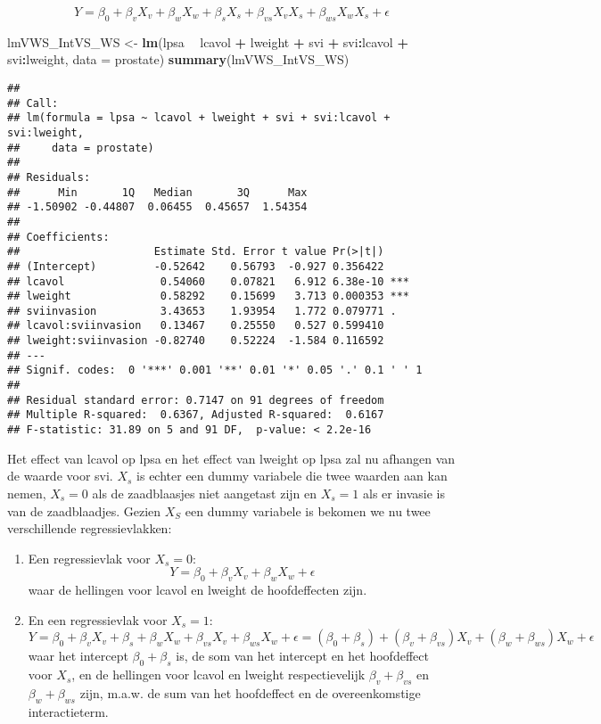 \documentclass[12pt,dutch,coursenotes]{book}
\newenvironment{Shaded}{\begin{snugshade}}{\end{snugshade}}
\newcommand{\KeywordTok}[1]{\textcolor[rgb]{0.13,0.29,0.53}{\textbf{#1}}}
\newcommand{\DataTypeTok}[1]{\textcolor[rgb]{0.13,0.29,0.53}{#1}}
\newcommand{\StringTok}[1]{\textcolor[rgb]{0.31,0.60,0.02}{#1}}
\newcommand{\OperatorTok}[1]{\textcolor[rgb]{0.81,0.36,0.00}{\textbf{#1}}}
\newcommand{\NormalTok}[1]{#1}
\providecommand{\tightlist}{%
  \setlength{\itemsep}{0pt}\setlength{\parskip}{0pt}}
\theoremstyle{definition}
\theoremstyle{definition}
\theoremstyle{definition}
\theoremstyle{remark}
\begin{document}
\[Y=\beta_0+\beta_vX_v+\beta_wX_w+\beta_sX_s+\beta_{vs}X_vX_s + \beta_{ws}X_wX_s +\epsilon\]

\begin{Shaded}
\begin{Highlighting}[]
\NormalTok{lmVWS_IntVS_WS <-}\StringTok{ }\KeywordTok{lm}\NormalTok{(lpsa }\OperatorTok{~}\StringTok{ }\NormalTok{lcavol }\OperatorTok{+}\StringTok{ }\NormalTok{lweight }\OperatorTok{+}\StringTok{ }\NormalTok{svi }\OperatorTok{+}\StringTok{ }
\StringTok{    }\NormalTok{svi}\OperatorTok{:}\NormalTok{lcavol }\OperatorTok{+}\StringTok{ }\NormalTok{svi}\OperatorTok{:}\NormalTok{lweight, }\DataTypeTok{data =}\NormalTok{ prostate)}
\KeywordTok{summary}\NormalTok{(lmVWS_IntVS_WS)}
\end{Highlighting}
\end{Shaded}

\begin{verbatim}
## 
## Call:
## lm(formula = lpsa ~ lcavol + lweight + svi + svi:lcavol + svi:lweight, 
##     data = prostate)
## 
## Residuals:
##      Min       1Q   Median       3Q      Max 
## -1.50902 -0.44807  0.06455  0.45657  1.54354 
## 
## Coefficients:
##                     Estimate Std. Error t value Pr(>|t|)    
## (Intercept)         -0.52642    0.56793  -0.927 0.356422    
## lcavol               0.54060    0.07821   6.912 6.38e-10 ***
## lweight              0.58292    0.15699   3.713 0.000353 ***
## sviinvasion          3.43653    1.93954   1.772 0.079771 .  
## lcavol:sviinvasion   0.13467    0.25550   0.527 0.599410    
## lweight:sviinvasion -0.82740    0.52224  -1.584 0.116592    
## ---
## Signif. codes:  0 '***' 0.001 '**' 0.01 '*' 0.05 '.' 0.1 ' ' 1
## 
## Residual standard error: 0.7147 on 91 degrees of freedom
## Multiple R-squared:  0.6367, Adjusted R-squared:  0.6167 
## F-statistic: 31.89 on 5 and 91 DF,  p-value: < 2.2e-16
\end{verbatim}

Het effect van lcavol op lpsa en het effect van lweight op lpsa zal nu
afhangen van de waarde voor svi. \(X_s\) is echter een dummy variabele
die twee waarden aan kan nemen, \(X_s=0\) als de zaadblaasjes niet
aangetast zijn en \(X_s=1\) als er invasie is van de zaadblaadjes.
Gezien \(X_S\) een dummy variabele is bekomen we nu twee verschillende
regressievlakken:

\begin{enumerate}
\def\labelenumi{\arabic{enumi}.}
\tightlist
\item
  Een regressievlak voor \(X_s=0\):
  \[Y=\beta_0+\beta_vX_v+\beta_wX_w + \epsilon\] waar de hellingen voor
  lcavol en lweight de hoofdeffecten zijn.
\item
  En een regressievlak voor \(X_s=1\):
  \[Y=\beta_0+\beta_vX_v+\beta_s+\beta_wX_w+\beta_{vs}X_v + \beta_{ws}X_w +\epsilon=(\beta_0+\beta_s)+(\beta_v+\beta_{vs})X_v+(\beta_w+\beta_{ws})X_w+\epsilon\]
  waar het intercept \(\beta_0 + \beta_s\) is, de som van het intercept
  en het hoofdeffect voor \(X_s\), en de hellingen voor lcavol en
  lweight respectievelijk \(\beta_v+\beta_{vs}\) en
  \(\beta_w+\beta_{ws}\) zijn, m.a.w. de sum van het hoofdeffect en de
  overeenkomstige interactieterm.
\end{enumerate}
\end{document}
